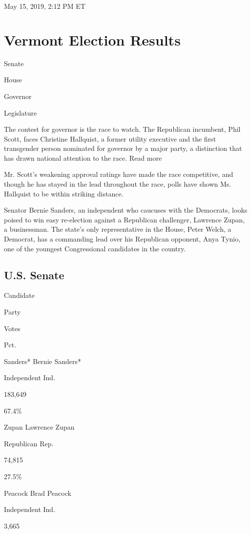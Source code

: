 May 15, 2019, 2:12 PM ET

\hypertarget{vermont-election-results}{%
\section{Vermont Election Results}\label{vermont-election-results}}

Senate

House

Governor

Legislature

The contest for governor is the race to watch. The Republican incumbent,
Phil Scott, faces Christine Hallquist, a former utility executive and
the first transgender person nominated for governor by a major party, a
distinction that has drawn national attention to the race. Read more

Mr. Scott's weakening approval ratings have made the race competitive,
and though he has stayed in the lead throughout the race, polls have
shown Ms. Hallquist to be within striking distance.

Senator Bernie Sanders, an independent who caucuses with the Democrats,
looks poised to win easy re-election against a Republican challenger,
Lawrence Zupan, a businessman. The state's only representative in the
House, Peter Welch, a Democrat, has a commanding lead over his
Republican opponent, Anya Tynio, one of the youngest Congressional
candidates in the country.

\hypertarget{us-senate}{%
\subsection{U.S. Senate}\label{us-senate}}

Candidate

Party

Votes

Pct.

 Sanders* Bernie Sanders*

Independent Ind.

183,649

67.4\%

 Zupan Lawrence Zupan

Republican Rep.

74,815

27.5\%

 Peacock Brad Peacock

Independent Ind.

3,665

